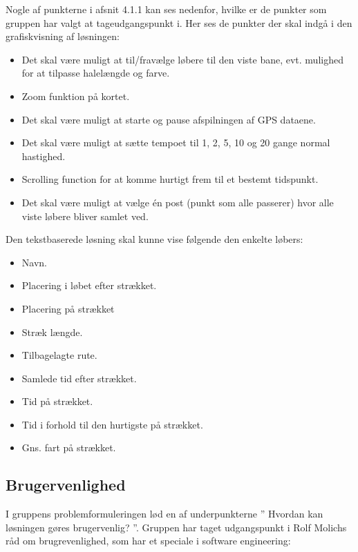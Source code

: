 Nogle af punkterne i afsnit 4.1.1 kan ses nedenfor, hvilke er de punkter som gruppen har valgt at tageudgangspunkt i. Her ses de punkter der skal indgå i den grafiskvisning af løsningen:
\begin{itemize}
\item Det skal være muligt at til/fravælge løbere til den viste bane, evt. mulighed for at tilpasse halelængde og farve.
\item Zoom funktion på kortet.
\item Det skal være muligt at starte og pause afspilningen af GPS dataene.
\item Det skal være muligt at sætte tempoet til 1, 2, 5, 10 og 20 gange normal hastighed.
\item Scrolling function for at komme hurtigt frem til et bestemt tidspunkt.
\item Det skal være muligt at vælge én post (punkt som alle passerer) hvor alle viste løbere bliver samlet ved.
\end{itemize}
Den tekstbaserede løsning skal kunne vise følgende den enkelte løbers:
\begin{itemize}
\item Navn.
\item Placering i løbet efter strækket.
\item Placering på strækket
\item Stræk længde.
\item Tilbagelagte rute.
\item Samlede tid efter strækket.
\item Tid på strækket.
\item Tid i forhold til den hurtigste på strækket.
\item Gns. fart på strækket.
\end{itemize}


\subsection{Brugervenlighed}
I gruppens problemformuleringen lød en af underpunkterne ” Hvordan kan løsningen gøres brugervenlig? ”. Gruppen har taget udgangspunkt i Rolf Molichs råd om brugrevenlighed, som har et speciale i software engineering: %

